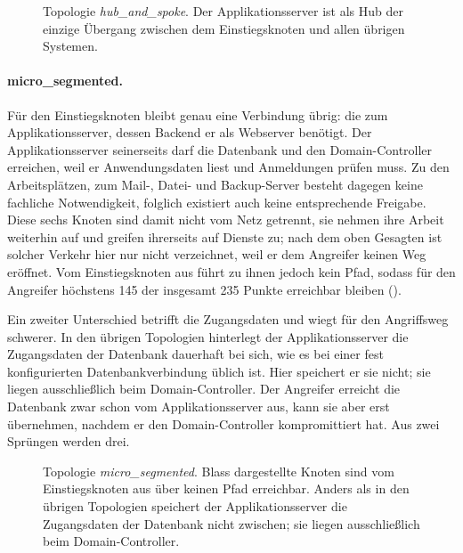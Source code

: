 \begin{figure}[H]
  \centering
  
  \caption[Topologie \emph{hub\_and\_spoke}]{Topologie \emph{hub\_and\_spoke}.
  Der Applikationsserver ist als Hub der einzige Übergang zwischen dem
  Einstiegsknoten und allen übrigen Systemen.}
  \label{fig:topo-hub}
\end{figure}

\paragraph{micro\_segmented.}
Für den Einstiegsknoten bleibt genau eine Verbindung übrig: die zum
Applikationsserver, dessen Backend er als Webserver benötigt. Der
Applikationsserver seinerseits darf die Datenbank und den Domain-Controller
erreichen, weil er Anwendungsdaten liest und Anmeldungen prüfen muss. Zu den
Arbeitsplätzen, zum Mail-, Datei- und Backup-Server besteht dagegen keine
fachliche Notwendigkeit, folglich existiert auch keine entsprechende Freigabe.
Diese sechs Knoten sind damit nicht vom Netz getrennt, sie nehmen ihre Arbeit
weiterhin auf und greifen ihrerseits auf Dienste zu; nach dem oben Gesagten ist
solcher Verkehr hier nur nicht verzeichnet, weil er dem Angreifer keinen Weg
eröffnet. Vom Einstiegsknoten aus führt zu ihnen jedoch kein Pfad, sodass für
den Angreifer höchstens 145 der insgesamt 235 Punkte erreichbar bleiben
().

Ein zweiter Unterschied betrifft die Zugangsdaten und wiegt für den Angriffsweg
schwerer. In den übrigen Topologien hinterlegt der Applikationsserver die
Zugangsdaten der Datenbank dauerhaft bei sich, wie es bei einer fest
konfigurierten Datenbankverbindung üblich ist. Hier speichert er sie nicht; sie
liegen ausschließlich beim Domain-Controller. Der Angreifer erreicht die
Datenbank zwar schon vom Applikationsserver aus, kann sie aber erst übernehmen,
nachdem er den Domain-Controller kompromittiert hat. Aus zwei Sprüngen werden
drei.

\begin{figure}[H]
  \centering
  
  \caption[Topologie \emph{micro\_segmented}]{Topologie
  \emph{micro\_segmented}. Blass dargestellte Knoten sind vom Einstiegsknoten
  aus über keinen Pfad erreichbar. Anders als in den übrigen Topologien
  speichert der Applikationsserver die Zugangsdaten der Datenbank
  nicht zwischen; sie liegen ausschließlich beim Domain-Controller.}
  \label{fig:topo-micro}
\end{figure}

